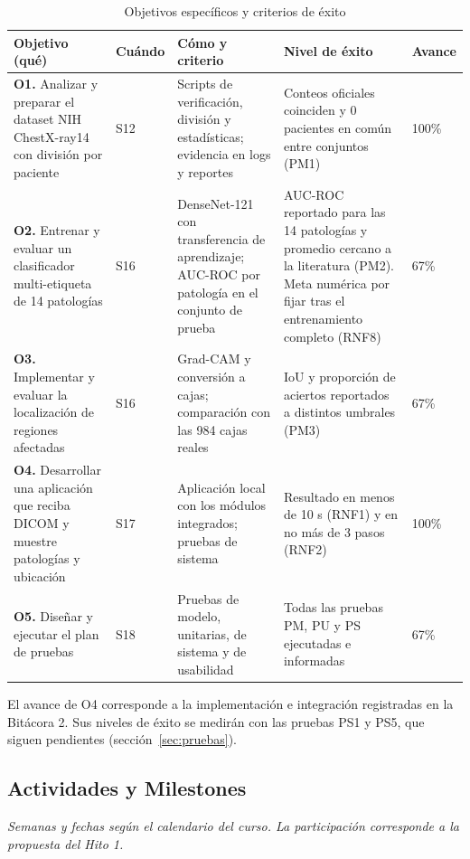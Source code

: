 \documentclass[11.5pt]{article}
\begin{document}
\begin{table}[H]
\centering
\footnotesize
\caption{Objetivos específicos y criterios de éxito}
\label{tab:objetivos}
\begin{tabularx}{\textwidth}{L{4.5cm} L{1.1cm} X X L{1.1cm}}
\toprule
Objetivo (qué) & Cuándo & Cómo y criterio & Nivel de éxito & Avance \\
\midrule
\textbf{O1.} Analizar y preparar el dataset NIH ChestX-ray14 con división por paciente & S12 & Scripts de verificación, división y estadísticas; evidencia en logs y reportes & Conteos oficiales coinciden y 0 pacientes en común entre conjuntos (PM1) & 100\% \\
\textbf{O2.} Entrenar y evaluar un clasificador multi-etiqueta de 14 patologías & S16 & DenseNet-121 con transferencia de aprendizaje; AUC-ROC por patología en el conjunto de prueba & AUC-ROC reportado para las 14 patologías y promedio cercano a la literatura (PM2). Meta numérica por fijar tras el entrenamiento completo (RNF8) & 67\% \\
\textbf{O3.} Implementar y evaluar la localización de regiones afectadas & S16 & Grad-CAM y conversión a cajas; comparación con las 984 cajas reales & IoU y proporción de aciertos reportados a distintos umbrales (PM3) & 67\% \\
\textbf{O4.} Desarrollar una aplicación que reciba DICOM y muestre patologías y ubicación & S17 & Aplicación local con los módulos integrados; pruebas de sistema & Resultado en menos de 10 s (RNF1) y en no más de 3 pasos (RNF2) & 100\% \\
\textbf{O5.} Diseñar y ejecutar el plan de pruebas & S18 & Pruebas de modelo, unitarias, de sistema y de usabilidad & Todas las pruebas PM, PU y PS ejecutadas e informadas & 67\% \\
\bottomrule
\end{tabularx}
\end{table}

El avance de O4 corresponde a la implementación e integración registradas en la Bitácora 2. Sus niveles de éxito se medirán con las pruebas PS1 y PS5, que siguen pendientes (sección~\ref{sec:pruebas}).

\subsection{Actividades y Milestones}

\textit{Semanas y fechas según el calendario del curso. La participación corresponde a la propuesta del Hito 1.}
\end{document}

